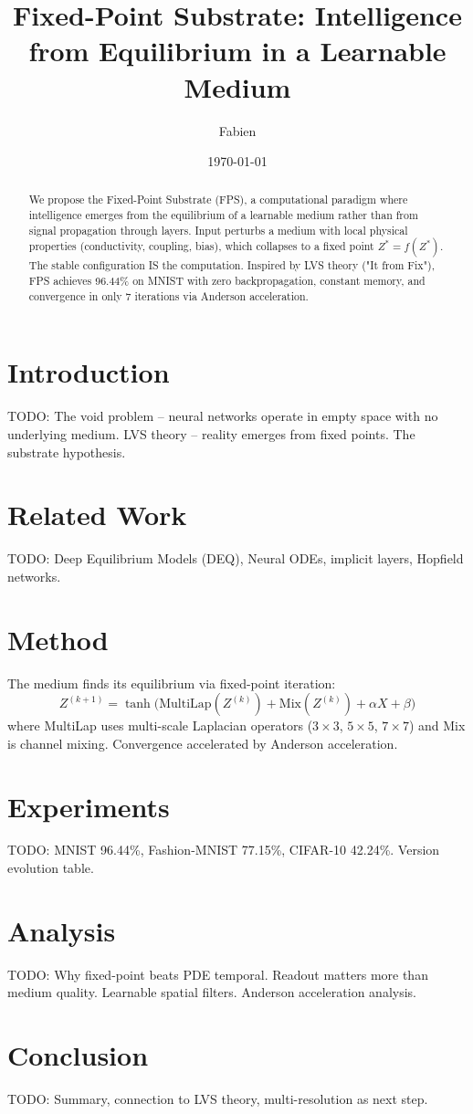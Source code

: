 \documentclass[11pt]{article}
\title{Fixed-Point Substrate: Intelligence from Equilibrium in a Learnable Medium}
\author{Fabien}
\date{\today}
\begin{document}
\maketitle

\begin{abstract}
We propose the Fixed-Point Substrate (FPS), a computational paradigm where intelligence
emerges from the equilibrium of a learnable medium rather than from signal propagation
through layers. Input perturbs a medium with local physical properties (conductivity,
coupling, bias), which collapses to a fixed point $Z^* = f(Z^*)$. The stable
configuration IS the computation. Inspired by LVS theory ("It from Fix"),
FPS achieves 96.44\% on MNIST with zero backpropagation, constant memory,
and convergence in only 7 iterations via Anderson acceleration.
\end{abstract}

\section{Introduction}
TODO: The void problem -- neural networks operate in empty space with no underlying medium.
LVS theory -- reality emerges from fixed points. The substrate hypothesis.

\section{Related Work}
TODO: Deep Equilibrium Models (DEQ), Neural ODEs, implicit layers, Hopfield networks.

\section{Method}

The medium finds its equilibrium via fixed-point iteration:
\begin{equation}
Z^{(k+1)} = \tanh\bigl(\text{MultiLap}(Z^{(k)}) + \text{Mix}(Z^{(k)}) + \alpha X + \beta\bigr)
\end{equation}
where MultiLap uses multi-scale Laplacian operators ($3\times3$, $5\times5$, $7\times7$)
and Mix is channel mixing. Convergence accelerated by Anderson acceleration.

\section{Experiments}
TODO: MNIST 96.44\%, Fashion-MNIST 77.15\%, CIFAR-10 42.24\%. Version evolution table.

\section{Analysis}
TODO: Why fixed-point beats PDE temporal. Readout matters more than medium quality.
Learnable spatial filters. Anderson acceleration analysis.

\section{Conclusion}
TODO: Summary, connection to LVS theory, multi-resolution as next step.



\end{document}
